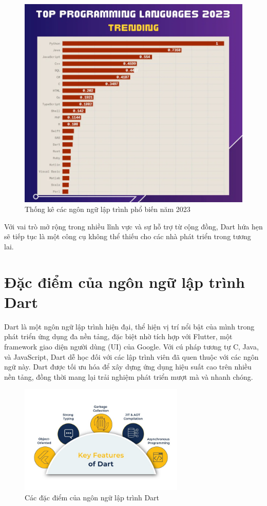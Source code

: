 \documentclass[../DoAn.tex]{subfiles}
\numberwithin{figure}{chapter}
\begin{document}
\begin{figure}[H]
    \centering
    \includegraphics[width=1\textwidth]{Hinhve/ranking.png}
    \caption{Thống kê các ngôn ngữ lập trình phổ biến năm 2023}
    \label{fig:dart_platforms}
\end{figure}

Với vai trò mở rộng trong nhiều lĩnh vực và sự hỗ trợ từ cộng đồng, Dart hứa hẹn sẽ tiếp tục là một công cụ không thể thiếu cho các nhà phát triển trong tương lai.

\section{Đặc điểm của ngôn ngữ lập trình Dart}
Dart là một ngôn ngữ lập trình hiện đại, thể hiện vị trí nổi bật của mình trong phát triển ứng dụng đa nền tảng, đặc biệt nhờ tích hợp với Flutter, một framework giao diện người dùng (UI) của Google. Với cú pháp tương tự C, Java, và JavaScript, Dart dễ học đối với các lập trình viên đã quen thuộc với các ngôn ngữ này. Dart được tối ưu hóa để xây dựng ứng dụng hiệu suất cao trên nhiều nền tảng, đồng thời mang lại trải nghiệm phát triển mượt mà và nhanh chóng.

\begin{figure}[H]
    \centering
    \includegraphics[width=0.7\textwidth]{Hinhve/dartFeatures.jpg}
    \caption{Các đặc điểm của ngôn ngữ lập trình Dart}
    \label{fig:dartimg}
\end{figure}
\end{document}
